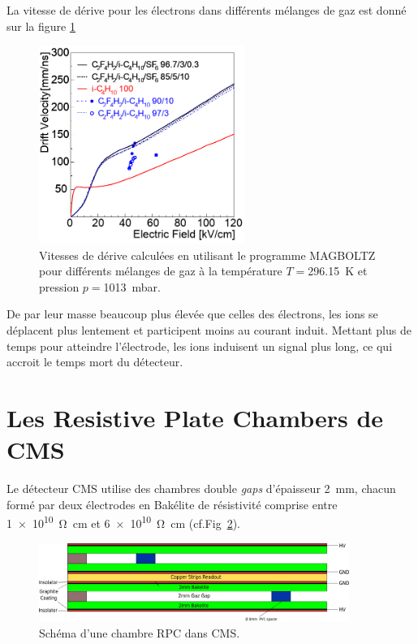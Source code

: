 La vitesse de dérive pour les électrons dans différents mélanges de gaz est donné sur la figure \ref{drift} \cite{Riegler:570462}

\begin{figure}[ht!]
	\centering
	\includegraphics[width=0.60\textwidth]{RPC/drift.png}
	\captionsetup{type=subfigure}\caption{Vitesses de dérive calculées en utilisant le programme MAGBOLTZ \cite{MAGBOLTZ} pour différents mélanges de gaz à la température $T=$\SI{296.15}{\kelvin} et pression $p=$\SI{1013}{\milli\bar}.}
	\label{drift}
\end{figure}

De par leur masse beaucoup plus élevée que celles des électrons, les ions se déplacent plus lentement et participent moins au courant induit. Mettant plus de temps pour atteindre l'électrode, les ions induisent un signal plus long, ce qui accroit le temps mort du détecteur.%

\section{Les Resistive Plate Chambers de CMS}

Le détecteur CMS utilise des chambres double \textit{gaps} d'épaisseur \SI{2}{\milli\meter}, chacun formé par deux électrodes en Bakélite de résistivité comprise entre \SI{1e10}{\ohm\centi\meter} et \SI{6e10}{\ohm\centi\meter} (cf.Fig~\ref{cmsrpc}). 

\begin{figure}[ht!]
	\centering
	\includegraphics[width=0.90\textwidth]{RPC/CMSRPC.png}
	\captionsetup{type=subfigure}\caption{Schéma d'une chambre RPC dans CMS.}
	\label{cmsrpc}
\end{figure}

